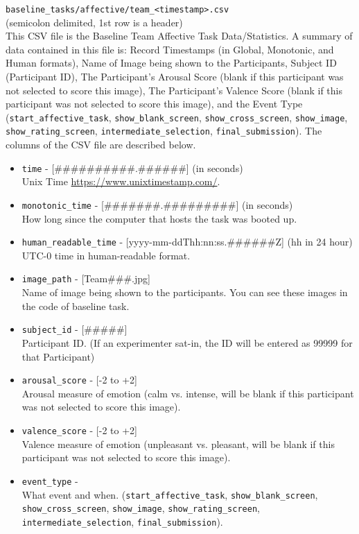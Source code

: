 \begin{description}
\medskip
\item\verb|baseline_tasks/affective/team_<timestamp>.csv| \\
    (semicolon delimited, 1st row is a header) \\
    This CSV file is the Baseline Team Affective Task Data/Statistics. A
    summary of data contained in this file is: Record Timestamps (in Global,
    Monotonic, and Human formats), Name of Image being shown to the
    Participants, Subject ID (Participant ID), The Participant's Arousal Score
    (blank if this participant was not selected to score this image), The
    Participant's Valence Score (blank if this participant was not selected to
    score this image), and the Event Type (\verb|start_affective_task|,
    \verb|show_blank_screen|, \verb|show_cross_screen|, \verb|show_image|,
    \verb|show_rating_screen|, \verb|intermediate_selection|,
    \verb|final_submission|). The columns of the CSV file are described below.
    \begin{itemize}
        \item \verb|time| - [\#\#\#\#\#\#\#\#\#\#.\#\#\#\#\#\#] (in seconds)\\
            Unix Time \url{https://www.unixtimestamp.com/}.
        \item \verb|monotonic_time| - [\#\#\#\#\#\#\#.\#\#\#\#\#\#\#\#\#] (in seconds)\\
            How long since the computer that hosts the task was booted up.
        \item \verb|human_readable_time| - [yyyy-mm-ddThh:nn:ss.\#\#\#\#\#\#Z] (hh in 24 hour)\\
            UTC-0 time in human-readable format.
        \item \verb|image_path| - [Team\#\#\#.jpg]\\
            Name of image being shown to the participants. You can see these images in the code of baseline task.
        \item \verb|subject_id| - [\#\#\#\#\#]\\
            Participant ID. (If an experimenter sat-in, the ID will be entered as 99999 for that Participant)
        \item \verb|arousal_score| - [-2 to +2]\\
            Arousal measure of emotion (calm vs. intense, will be blank if this
            participant was not selected to score this image).
        \item \verb|valence_score| - [-2 to +2]\\
            Valence measure of emotion (unpleasant vs. pleasant, will be blank
            if this participant was not selected to score this image).
        \item \verb|event_type| -\\
            What event and when.
            (\verb|start_affective_task|, \verb|show_blank_screen|,
            \verb|show_cross_screen|, \verb|show_image|, \verb|show_rating_screen|,
            \verb|intermediate_selection|, \verb|final_submission|).
    \end{itemize}



\end{description}
